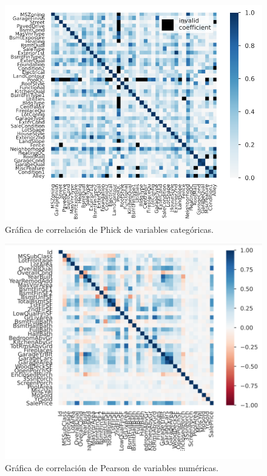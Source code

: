 \begin{figure}[H]
	\centering 
	\includegraphics[scale=.4]{Images/4}
	\caption{Gráfica de correlación de Phick de variables categóricas.}
	\label{fig:4}
\end{figure}

\begin{figure}[H]
	\centering 
	\includegraphics[scale=.4]{Images/5}
	\caption{Gráfica de correlación de Pearson de variables numéricas.}
		\label{fig:5}
\end{figure}


